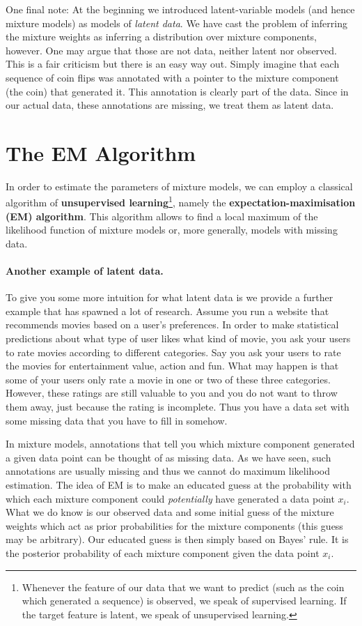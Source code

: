 \documentclass[a4paper,11pt,leqno]{report}\usepackage[]{graphicx}\usepackage[]{color}
\begin{document}
One final note: At the beginning we introduced latent-variable models (and hence mixture models) as models
of \textit{latent data}. We have cast the problem of inferring the mixture weights as inferring a 
distribution over mixture components, however. One may argue that those are not data, neither latent nor 
observed. This is a fair criticism but there is an easy way out. Simply imagine that each sequence of coin
flips was annotated with a pointer to the mixture component (the coin) that generated it. This annotation
is clearly part of the data. Since in our actual data, these annotations are missing, we treat them as 
latent data.

\section{The EM Algorithm}

In order to estimate the parameters of mixture models, we can employ a classical algorithm of 
\textbf{unsupervised learning}\footnote{Whenever the feature of our
  data that we want to predict (such as the coin which generated a sequence)
is observed, we speak of supervised learning. If the target feature is latent, we speak of unsupervised learning.}, 
namely the \textbf{expectation-maximisation (EM) algorithm}. This
algorithm allows to find a local maximum of the likelihood function of mixture models or, more
generally, models with missing data. 

\paragraph{Another example of latent data.} To give you some more intuition for what latent data is we provide a further example that has
spawned a lot of research. Assume you run a website that recommends movies
based on a user's preferences. In order to make statistical predictions about what type of user
likes what kind of movie, you ask your users to rate movies according to different categories.
Say you ask your users to rate the movies for entertainment value, action and fun. What may happen is
that some of your users only rate a movie in one or two of these three categories. However, these
ratings are still valuable to you and you do not want to throw them away, just because the rating is
incomplete. Thus you have a data set with some missing data that you have to fill in somehow.
\bigskip

In mixture models, annotations that tell you which mixture component
generated a given data point can be thought of as missing data. As we have seen, such annotations
are usually missing and thus we cannot do maximum likelihood estimation. The idea of EM is to
make an educated guess at the probability with which each mixture component could \textit{potentially}
have generated a data point $ x_{i} $. What we do know is our observed data and some initial guess of the mixture
weights which act as prior probabilities for the mixture components (this guess may be arbitrary). 
Our educated guess is then simply based on Bayes' rule. It is the posterior probability of each mixture
component given the data point $ x_{i} $.
\end{document}
